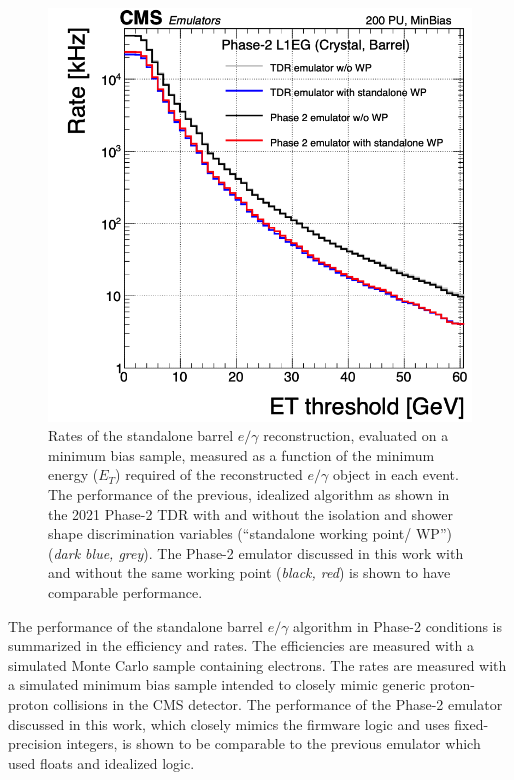 \begin{figure}[ht]
    \centering
    \includegraphics[width=12cm]{figures/ch-3-phase2/results-egamma-rates.png}
    \caption[Rates of the standalone barrel $e/\gamma$ reconstruction measured as a function of the minimum energy ($E_T$) required of the reconstructed $e/\gamma$ object in each event.]{Rates of the standalone barrel $e/\gamma$ reconstruction, evaluated on a minimum bias sample, measured as a function of the minimum energy ($E_T$) required of the reconstructed $e/\gamma$ object in each event. The performance of the previous, idealized algorithm as shown in the 2021 Phase-2 TDR \cite{CMS-TDR-021} with and without the isolation and shower shape discrimination variables (``standalone working point/ WP'') (\textit{dark blue, grey}). The Phase-2 emulator discussed in this work with and without the same working point (\textit{black, red}) is shown to have comparable performance.}
    \label{fig:results-egamma-rates}
\end{figure}


The performance of the standalone barrel $e/\gamma$ algorithm in Phase-2 conditions is summarized in the efficiency and rates. The efficiencies are measured with a simulated Monte Carlo sample containing electrons. The rates are measured with a simulated minimum bias sample intended to closely mimic generic proton-proton collisions in the CMS detector. The performance of the Phase-2 emulator discussed in this work, which closely mimics the firmware logic and uses fixed-precision integers, is shown to be comparable to the previous emulator which used floats and idealized logic.

